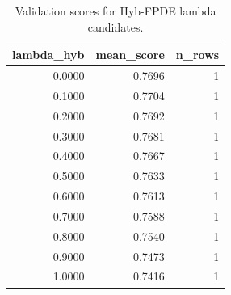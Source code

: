 \begin{table}[t]
\caption{Validation scores for Hyb-FPDE lambda candidates.}
\label{tab:lambda_distribution_computed}
\centering
\begin{tabular}{rrr}
\toprule
lambda\_hyb & mean\_score & n\_rows \\
\midrule
0.0000 & 0.7696 & 1 \\
0.1000 & 0.7704 & 1 \\
0.2000 & 0.7692 & 1 \\
0.3000 & 0.7681 & 1 \\
0.4000 & 0.7667 & 1 \\
0.5000 & 0.7633 & 1 \\
0.6000 & 0.7613 & 1 \\
0.7000 & 0.7588 & 1 \\
0.8000 & 0.7540 & 1 \\
0.9000 & 0.7473 & 1 \\
1.0000 & 0.7416 & 1 \\
\bottomrule
\end{tabular}

\end{table}

